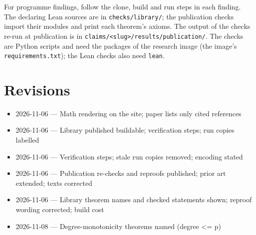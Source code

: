 \documentclass{article}
\begin{document}
For programme findings, follow the clone, build and run steps in each finding. The declaring Lean sources are in \texttt{checks/library/}; the publication checks import their modules and print each theorem's axioms. The output of the checks re-run at publication is in \texttt{claims/<slug>/results/publication/}. The checks are Python scripts and need the packages of the research image (the image's \texttt{requirements.txt}); the Lean checks also need \texttt{lean}.

\section{Revisions}

\begin{itemize}
\item 2026-11-06 --- Math rendering on the site; paper lists only cited references
\item 2026-11-06 --- Library published buildable; verification steps; run copies labelled
\item 2026-11-06 --- Verification steps; stale run copies removed; encoding stated
\item 2026-11-06 --- Publication re-checks and reproofs published; prior art extended; texts corrected
\item 2026-11-06 --- Library theorem names and checked statements shown; reproof wording corrected; build cost
\item 2026-11-08 --- Degree-monotonicity theorems named (degree \textless{}= p)
\end{itemize}



\end{document}
